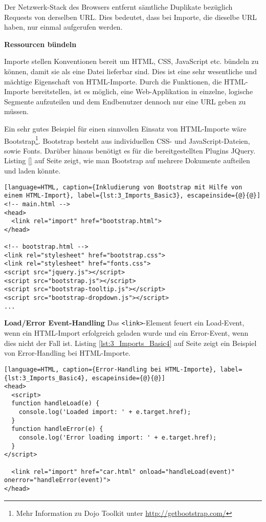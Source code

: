 Der Netzwerk-Stack des Browsers entfernt sämtliche Duplikate bezüglich Requests von derselben URL. Dies bedeutet, dass bei Importe, die dieselbe URL haben, nur einmal aufgerufen werden.

\textbf{Ressourcen bündeln}

Importe stellen Konventionen bereit um HTML, CSS, JavaScript etc. bündeln zu können, damit sie als eine Datei lieferbar sind. Dies ist eine sehr wesentliche und mächtige Eigenschaft von HTML-Importe. Durch die Funktionen, die HTML-Importe bereitstellen, ist es möglich, eine Web-Applikation in einzelne, logische Segmente aufzuteilen und dem Endbenutzer dennoch nur eine URL geben zu müssen.

Ein sehr gutes Beispiel für einen sinnvollen Einsatz von HTML-Importe wäre Bootstrap\footnote{Mehr Information zu Dojo Toolkit unter \href{http://getbootstrap.com/}{http://getbootstrap.com/}}. Bootstrap besteht aus individuellen CSS- und JavaScript-Dateien, sowie Fonts. Darüber hinaus benötigt es für die bereitgestellten Plugins JQuery. Listing \ref{} auf Seite \pageref{} zeigt, wie man Bootstrap auf mehrere Dokumente aufteilen und laden könnte.

\begin{lstlisting}[language=HTML, caption={Inkludierung von Bootstrap mit Hilfe von einem HTML-Import}, label={lst:3_Imports_Basic3}, escapeinside={@}{@}]
<!-- main.html -->
<head>
  <link rel="import" href="bootstrap.html">
</head>

<!-- bootstrap.html -->
<link rel="stylesheet" href="bootstrap.css">
<link rel="stylesheet" href="fonts.css">
<script src="jquery.js"></script>
<script src="bootstrap.js"></script>
<script src="bootstrap-tooltip.js"></script>
<script src="bootstrap-dropdown.js"></script>
...
\end{lstlisting}

\textbf{Load/Error Event-Handling}
Das \lstinline|<link>|-Element feuert ein \glqq Load\grqq -Event, wenn ein HTML-Import erfolgreich geladen wurde und ein \glqq Error\grqq -Event, wenn dies nicht der Fall ist. Listing \ref{lst:3_Imports_Basic4} auf Seite \pageref{lst:3_Imports_Basic4} zeigt ein Beispiel von Error-Handling bei HTML-Importe.

\begin{lstlisting}[language=HTML, caption={Error-Handling bei HTML-Importe}, label={lst:3_Imports_Basic4}, escapeinside={@}{@}]
<head>
  <script>
  function handleLoad(e) {
    console.log('Loaded import: ' + e.target.href);
  }
  function handleError(e) {
    console.log('Error loading import: ' + e.target.href);
  }
</script>

  <link rel="import" href="car.html" onload="handleLoad(event)" onerror="handleError(event)">
</head>
\end{lstlisting}

